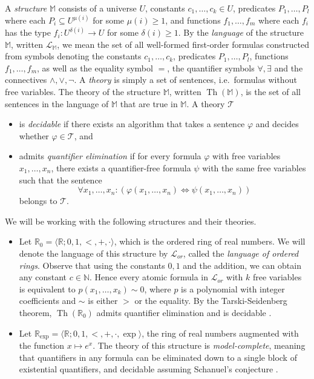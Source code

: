 \documentclass[a4paper,UKenglish,cleveref]{lipics-v2021}
\newcommand{\nat}{\mathbb{N}}
\newcommand{\rel}{\mathbb{R}}
\newcommand{\rexp}{\rel_{\exp}}
\newcommand{\Lcal}{\mathcal{L}}
\newcommand{\Tcal}{\mathcal{T}}
\newcommand{\Mb}{\mathbb{M}}
\begin{document}
A \emph{structure} $\mathbb{M}$ consists of a universe $U$, constants $c_1,\ldots,c_k \in U$, predicates $P_1,\ldots,P_l$ where each $P_i \subseteq U^{\mu(i)}$ for some $\mu(i) \ge 1$, and functions $f_1,\ldots,f_m$ where each $f_i$ has the type $f_i \colon U^{\delta(i)} \to U$ for some $\delta(i) \ge 1$.
By the \emph{language} of the structure $\mathbb{M}$, written  $\Lcal_{\Mb}$, we mean the set of all well-formed first-order formulas constructed from symbols denoting  the constants $c_1,\ldots, c_k$, predicates $P_1,\ldots,P_l$, functions $f_1,\ldots, f_m$, as well as the equality symbol $=$, the quantifier symbols $\forall, \exists$ and the connectives $\land, \lor, \lnot$.
A \emph{theory} is simply a set of sentences, i.e.\ formulas without free variables.
The theory of the structure $\mathbb{M}$, written $\operatorname{Th}(\Mb)$, is the set of all sentences in the language of $\mathbb{M}$ that are true in $\mathbb{M}$.
A theory $\Tcal$
\begin{itemize}
	\item is \emph{decidable} if there exists an algorithm that takes a sentence $\varphi$ and decides whether $\varphi \in \Tcal$, and
	\item admits \emph{quantifier elimination} if for every formula $\varphi$ with free variables $x_1,\ldots,x_n$, there exists a quantifier-free formula $\psi$ with the same free variables such that the sentence
	\[
	\forall x_1,\ldots,x_n\colon (\varphi(x_1,\ldots,x_n) \Leftrightarrow \psi(x_1,\ldots,x_n))
	\]
	belongs to $\Tcal$.
\end{itemize}

We will be working with the following structures and their theories.
\begin{itemize}
	\item Let $\rel_0  = \langle \rel; 0,1,<,+,\cdot \rangle$, which is the ordered ring of real numbers.
	We will denote the language of this structure by $\Lcal_{or}$, called the \emph{language of ordered rings}.
	Observe that using the constants $0,1$ and the addition, we can obtain any constant $c \in \nat$.
	Hence every atomic formula in $\Lcal_{or}$ with $k$ free variables is equivalent to $p(x_1,\ldots,x_k) \sim 0$, where $p$ is a polynomial with integer coefficients and $\sim$ is either $>$ or the equality.
	By the Tarski-Seidenberg theorem, $\operatorname{Th}(\rel_0)$ admits quantifier elimination and is decidable \cite{bochnak2013real}.
	\item Let $\rexp = \langle \rel; 0,1,<,+,\cdot, \exp \rangle$, the ring of real numbers augmented with the function $x \mapsto e^x$.
	The theory of this structure is \emph{model-complete}, meaning that quantifiers in any formula can be eliminated down to a single block of existential quantifiers, and decidable assuming Schanuel's conjecture \cite{vdD1994bounded-analytic,macintyre1996decidability}.
\end{itemize}
\end{document}
